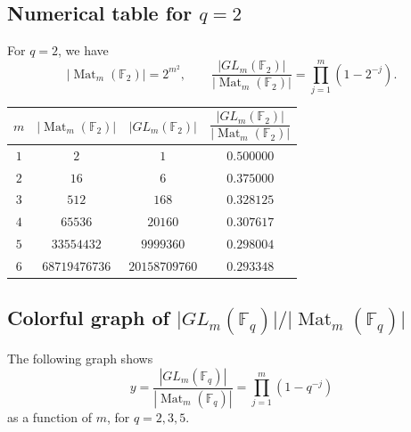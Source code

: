 \documentclass[11pt]{article}
\newcommand{\F}{\mathbb{F}}
\newcommand{\Mat}{\operatorname{Mat}}
\begin{document}
	\subsection{\texorpdfstring{Numerical table for \(q=2\)}{Numerical table for q=2}}
	
	For \(q=2\), we have
	\[
	|\Mat_m(\F_2)|=2^{m^2},
	\qquad
	\frac{|GL_m(\F_2)|}{|\Mat_m(\F_2)|}
	=
	\prod_{j=1}^{m}(1-2^{-j}).
	\]
	
	\begin{center}
		\renewcommand{\arraystretch}{1.35}
		\begin{tabular}{c c c c}
			\toprule
			\rowcolor{red!15}
			\(m\) & \(\lvert \Mat_m(\F_2)\rvert\) & \(\lvert GL_m(\F_2)\rvert\) & \(\dfrac{\lvert GL_m(\F_2)\rvert}{\lvert \Mat_m(\F_2)\rvert}\) \\
			\midrule
			\(1\) & \(2\) & \(1\) & \(0.500000\) \\
			
			\rowcolor{gray!8}
			\(2\) & \(16\) & \(6\) & \(0.375000\) \\
			
			\(3\) & \(512\) & \(168\) & \(0.328125\) \\
			
			\rowcolor{gray!8}
			\(4\) & \(65536\) & \(20160\) & \(0.307617\) \\
			
			\(5\) & \(33554432\) & \(9999360\) & \(0.298004\) \\
			
			\rowcolor{gray!8}
			\(6\) & \(68719476736\) & \(20158709760\) & \(0.293348\) \\
			\bottomrule
		\end{tabular}
	\end{center}
	
	\subsection{\texorpdfstring{Colorful graph of \(\lvert GL_m(\F_q)\rvert/\lvert \Mat_m(\F_q)\rvert\)}{Colorful graph of the ratio}}
	
	The following graph shows
	\[
	y=\frac{|GL_m(\F_q)|}{|\Mat_m(\F_q)|}
	=
	\prod_{j=1}^{m}(1-q^{-j})
	\]
	as a function of \(m\), for \(q=2,3,5\).
	
\end{document}
